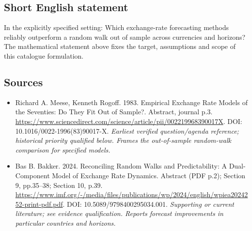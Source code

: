 \documentclass[11pt]{article}
\begin{document}
\subsection{Short English statement}
In the explicitly specified setting: Which exchange-rate forecasting methods reliably outperform a random walk out of sample across currencies and horizons? The mathematical statement above fixes the target, assumptions and scope of this catalogue formulation.

\subsection{Sources}
\begin{itemize}\raggedright
\item[\textnormal{[S1]}]\hypertarget{source:30007612:1}{} Richard A. Meese, Kenneth Rogoff. 1983. Empirical Exchange Rate Models of the Seventies: Do They Fit Out of Sample?. Abstract, journal p.3.
\url{https://www.sciencedirect.com/science/article/pii/002219968390017X}.
DOI: 10.1016/0022-1996(83)90017-X.
{\small\textit{Earliest verified question/agenda reference; historical priority qualified below. Frames the out-of-sample random-walk comparison for specified models.}}

\item[\textnormal{[S2]}]\hypertarget{source:30007612:2}{} Bas B. Bakker. 2024. Reconciling Random Walks and Predictability: A Dual-Component Model of Exchange Rate Dynamics. Abstract (PDF p.2); Section 9, pp.35–38; Section 10, p.39.
\url{https://www.imf.org/-/media/files/publications/wp/2024/english/wpiea2024252-print-pdf.pdf}.
DOI: 10.5089/9798400295034.001.
{\small\textit{Supporting or current literature; see evidence qualification. Reports forecast improvements in particular countries and horizons.}}
\end{itemize}
\end{document}
